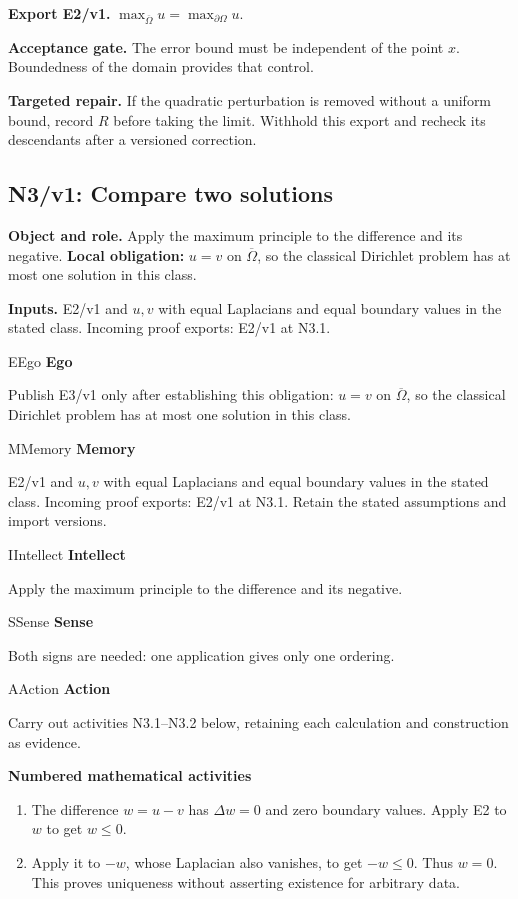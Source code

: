 \documentclass[preprint,12pt,aps,pra,showkeys,amsmath,amssymb,superscriptaddress,floatfix]{revtex4-2}
\theoremstyle{definition}
\theoremstyle{remark}
\newcommand{\mmfaculty}[3]{%
 \begin{mmfacultybox}{#1}{#2}
 {\sffamily\bfseries\color{MMBlue}#2}\par\smallskip #3
 \end{mmfacultybox}}
\newcommand{\field}[2]{\par\smallskip\noindent\textbf{#1.} #2\par}
\begin{document}
\field{Export E2/v1}{\(\max_{\overline\Omega}u=\max_{\partial\Omega}u\).}

\field{Acceptance gate}{The error bound must be independent of the point \(x\). Boundedness of
the domain provides that control.}

\field{Targeted repair}{If the quadratic perturbation is removed without a uniform bound, record
\(R\) before taking the limit. Withhold this export and recheck its
descendants after a versioned correction.}

\clearpage

\subsection{N3/v1: Compare two solutions}

\field{Object and role}{Apply the maximum principle to the difference and its negative.
\textbf{Local obligation:} \(u=v\) on \(\overline\Omega\), so the
classical Dirichlet problem has at most one solution in this class.}

\field{Inputs}{E2/v1 and \(u,v\) with equal Laplacians and equal boundary values in the
stated class. Incoming proof exports: E2/v1 at N3.1.}

\mmfaculty{E}{Ego}{Publish E3/v1 only after establishing this obligation: \(u=v\) on
\(\overline\Omega\), so the classical Dirichlet problem has at most one
solution in this class.}

\mmfaculty{M}{Memory}{E2/v1 and \(u,v\) with equal Laplacians and equal boundary values in the
stated class. Incoming proof exports: E2/v1 at N3.1. Retain the stated
assumptions and import versions.}

\mmfaculty{I}{Intellect}{Apply the maximum principle to the difference and its negative.}

\mmfaculty{S}{Sense}{Both signs are needed: one application gives only one ordering.}

\mmfaculty{A}{Action}{Carry out activities N3.1--N3.2 below, retaining each calculation and
construction as evidence.}

\smallskip\noindent\textbf{Numbered mathematical activities}

\begin{enumerate}[label=N3.\arabic*,leftmargin=3.4em]

\item The difference \(w=u-v\) has \(\Delta w=0\) and zero boundary values.
Apply E2 to \(w\) to get \(w\le0\).

\item Apply it to \(-w\), whose Laplacian also vanishes, to get \(-w\le0\).
Thus \(w=0\). This proves uniqueness without asserting existence for
arbitrary data.

\end{enumerate}
\end{document}

